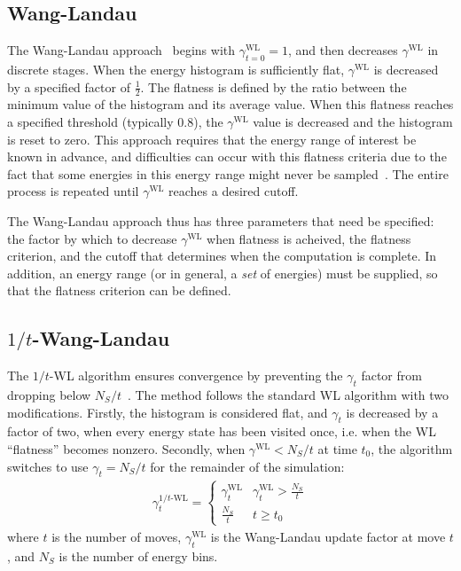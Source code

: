 \documentclass[letterpaper,twocolumn,amsmath,amssymb,pre,aps,10pt]{revtex4-1}
\begin{document}
\subsection{Wang-Landau}

The Wang-Landau approach~\cite{wang2001efficient,wang2001determining,
  landau2014guide} begins with $\gamma^{\text{WL}}_{t=0}=1$, and then decreases $\gamma^{\text{WL}}$
in discrete stages.  When the energy histogram is sufficiently flat,
$\gamma^{\text{WL}}$ is decreased by a specified factor of $\frac12$.  The
flatness is defined by the ratio between the minimum value of the
histogram and its average value.  When this flatness reaches a
specified threshold (typically 0.8), the $\gamma^{\text{WL}}$ value is decreased
and the histogram is reset to zero.  This approach requires that the
energy range of interest be known in advance, and difficulties can
occur with this flatness criteria due to the fact that some energies
in this energy range might never be
sampled~\cite{troster2005wang}.  The entire process is repeated
until $\gamma^{\text{WL}}$ reaches a desired cutoff.

The Wang-Landau approach thus has three parameters that need be
specified: the factor by which to decrease $\gamma^{\text{WL}}$ when flatness is
acheived, the flatness criterion, and the cutoff that determines when
the computation is complete.  In addition, an energy range (or in
general, a \emph{set} of energies) must be supplied, so that the
flatness criterion can be defined.

\subsection{$1/t$-Wang-Landau}

The $1/t$-WL algorithm ensures convergence by preventing the $\gamma_t$ factor
from dropping below $N_S/t$~\cite{belardinelli2008analysis, schneider2017convergence}.
The method follows the standard WL algorithm with two modifications.  Firstly, the histogram
is considered flat, and $\gamma_t$ is decreased by a factor of two, when every
energy state has been visited once, i.e. when the WL ``flatness'' becomes nonzero.
Secondly, when $\gamma^{\text{WL}} < N_S/t$ at time $t_0$, the algorithm switches
to use  $\gamma_t = N_S/t$ for the remainder of the simulation:
\begin{align}
  \gamma_t^{1/t\text{-WL}} = \begin{cases}
     \gamma^{\text{WL}}_t & \gamma^{\text{WL}}_t > \frac{N_S}{t} \\
     \frac{N_S}{t} & t \ge t_0
 \end{cases}
\end{align}
where $t$ is the number of moves, $\gamma^{\text{WL}}_t$ is the Wang-Landau update factor
at move $t$, and $N_S$ is the number of energy bins.
\end{document}
